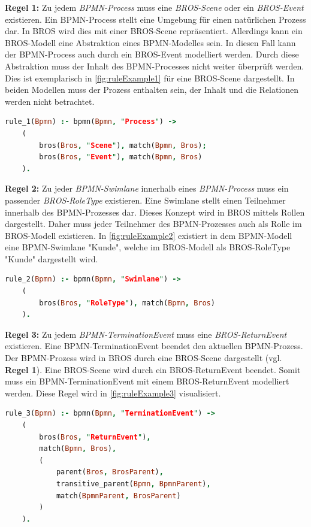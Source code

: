 \textbf{Regel 1:} 
Zu jedem \emph{BPMN-Process} muss eine \emph{BROS-Scene} oder ein \emph{BROS-Event} existieren.
Ein BPMN-Process stellt eine Umgebung für einen natürlichen Prozess dar.
In BROS wird dies mit einer BROS-Scene repräsentiert.
Allerdings kann ein BROS-Modell eine Abstraktion eines BPMN-Modelles sein.
In diesen Fall kann der BPMN-Process auch durch ein BROS-Event modelliert werden.
Durch diese Abstraktion muss der Inhalt des BPMN-Processes nicht weiter überprüft werden.
Dies ist exemplarisch in \cref{fig:ruleExample1} für eine BROS-Scene dargestellt.
In beiden Modellen muss der Prozess enthalten sein, der Inhalt und die Relationen werden nicht betrachtet.

\begin{lstlisting}[language=Prolog, caption=Formalisierung der Regel 1, label=lst:rule_1]
rule_1(Bpmn) :- bpmn(Bpmn, "Process") ->
    (
        bros(Bros, "Scene"), match(Bpmn, Bros);
        bros(Bros, "Event"), match(Bpmn, Bros)
    ).
\end{lstlisting}

\textbf{Regel 2:}
Zu jeder \emph{BPMN-Swimlane} innerhalb eines \emph{BPMN-Process} muss ein passender \emph{BROS-RoleType} existieren.
Eine Swimlane stellt einen Teilnehmer innerhalb des BPMN-Prozesses dar. 
Dieses Konzept wird in BROS mittels Rollen dargestellt.
Daher muss jeder Teilnehmer des BPMN-Prozesses auch als Rolle im BROS-Modell existieren.
In \cref{fig:ruleExample2} existiert in dem BPMN-Modell eine BPMN-Swimlane "Kunde", welche im BROS-Modell als BROS-RoleType "Kunde" dargestellt wird.

\begin{lstlisting}[language=Prolog, caption=Formalisierung der Regel 2, label=lst:rule_2]
rule_2(Bpmn) :- bpmn(Bpmn, "Swimlane") ->
    (
        bros(Bros, "RoleType"), match(Bpmn, Bros)
    ).
\end{lstlisting}

\textbf{Regel 3:}
Zu jedem \emph{BPMN-TerminationEvent} muss eine \emph{BROS-ReturnEvent} existieren.
Eine BPMN-TerminationEvent beendet den aktuellen BPMN-Prozess.
Der BPMN-Prozess wird in BROS durch eine BROS-Scene dargestellt (vgl. \textbf{Regel 1}).
Eine BROS-Scene wird durch ein BROS-ReturnEvent beendet.
Somit muss ein BPMN-TerminationEvent mit einem BROS-ReturnEvent modelliert werden.
Diese Regel wird in \cref{fig:ruleExample3} visualisiert.

\begin{lstlisting}[language=Prolog, caption=Formalisierung der Regel 3, label=lst:rule_3]
rule_3(Bpmn) :- bpmn(Bpmn, "TerminationEvent") ->
    (
        bros(Bros, "ReturnEvent"), 
        match(Bpmn, Bros),
        (
            parent(Bros, BrosParent),
            transitive_parent(Bpmn, BpmnParent),
            match(BpmnParent, BrosParent)
        )
    ).
\end{lstlisting}

